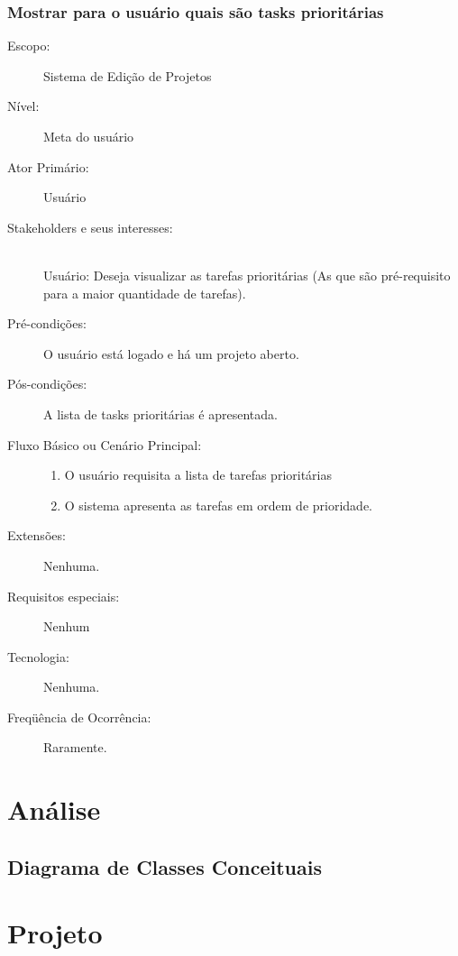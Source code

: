 \documentclass[brazil,times]{abnt}
\begin{document}
\subsection{Mostrar para o usuário quais são tasks prioritárias}
\begin{description}
\item[Escopo:] Sistema de Edição de Projetos
\item[Nível:] Meta do usuário
\item[Ator Primário:] Usuário

\item[Stakeholders e seus interesses:] \hfill \\ 
Usuário: Deseja visualizar as tarefas prioritárias (As que são pré-requisito
para a maior quantidade de tarefas).

\item[Pré-condições:] O usuário está logado e há um projeto aberto.

\item[Pós-condições:] A lista de tasks prioritárias é apresentada.

\item[Fluxo Básico ou Cenário Principal:] \hfill
\begin{enumerate}
  \item O usuário requisita a lista de tarefas prioritárias
  \item O sistema apresenta as tarefas em ordem de prioridade.
\end{enumerate}

\item[Extensões:] Nenhuma.
\item[Requisitos especiais:] Nenhum

\item[Tecnologia:] Nenhuma.
\item[Freqüência de Ocorrência:] Raramente.

\end{description}


\chapter{Análise}
\section{Diagrama de Classes Conceituais}


\chapter{Projeto}
\end{document}
